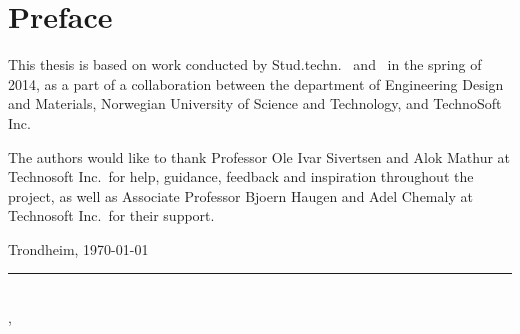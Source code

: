 \section*{\Huge Preface}
\vspace{1 cm}


\noindent This thesis is based on work conducted by Stud.techn. \myauthorA\ and \myauthorB\ in the spring of 2014, as a part of a collaboration between the department of Engineering Design and Materials, Norwegian University of Science and Technology, and TechnoSoft Inc.

\noindent The authors would like to thank Professor Ole Ivar Sivertsen and Alok Mathur at Technosoft Inc.\ for help, guidance, feedback and inspiration throughout the project, as well as Associate Professor Bjoern Haugen and Adel Chemaly at Technosoft Inc.\ for their support.



Trondheim, \today


\rule{10cm}{0.5pt}\\
\indent \myauthorA, \myauthorB\

\cleardoublepage\
